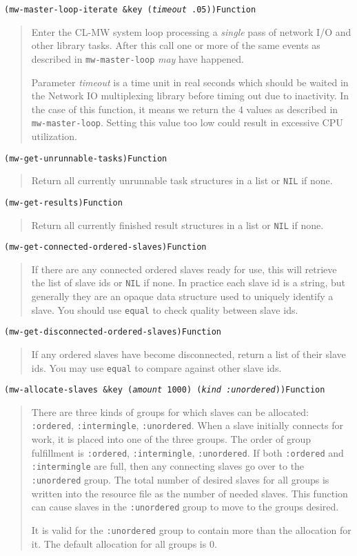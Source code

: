 \documentclass[titlepage,12pt]{book}
\newcommand{\xsmall}{\latexhtml{\small}{}}
\newcommand{\xnormalsize}{\latexhtml{\normalsize}{}}
\newcommand{\clmw}{\xsmall\textsc{CL-MW}\xnormalsize\xspace}
\newcommand{\un}{\texttt{:unordered}\xspace}
\newcommand{\inter}{\texttt{:intermingle}\xspace}
\newcommand{\ord}{\texttt{:ordered}\xspace}
\newcommand{\func}[1]{\mbox{\texttt{#1}}\xspace}
\newcommand{\bool}[1]{\texttt{#1}\xspace}
\newcommand{\apifunc}[2]{\noindent\xsmall\texttt{(#1)}\hspace*{\fill}\xnormalsize\texttt{#2}}
\newenvironment{apientry}[2]
	{\apifunc{#1}{#2}\begin{quotation}}
	{\end{quotation}}
\begin{document}
\begin{apientry}
{mw-master-loop-iterate \&key (\emph{timeout} .05)}
{Function}
Enter the \clmw system loop processing a \emph{single} pass of network
I/O and other library tasks. After this call one or more of the same events
as described in \func{mw-master-loop} \emph{may} have happened.

Parameter \emph{timeout} is a time unit in real seconds which should
be waited in the Network IO multiplexing library before timing out
due to inactivity.  In the case of this function, it means we return
the 4 values as described in \func{mw-master-loop}. Setting this value
too low could result in excessive CPU utilization.

\end{apientry}

\begin{apientry}
{mw-get-unrunnable-tasks}
{Function}
Return all currently unrunnable task structures in a list or \bool{NIL} if none.
\end{apientry}

\begin{apientry}
{mw-get-results}
{Function}
Return all currently finished result structures in a list or \bool{NIL} if none.
\end{apientry}

\begin{apientry}
{mw-get-connected-ordered-slaves}
{Function}
If there are any connected ordered slaves ready for use, this will
retrieve the list of slave ids or \bool{NIL} if none. In practice each slave
id is a string, but generally they are an opaque data structure used
to uniquely identify a slave. You should use \func{equal} to check
quality between slave ids.
\end{apientry}

\begin{apientry}
{mw-get-disconnected-ordered-slaves}
{Function}
If any ordered slaves have become disconnected, return a list of
their slave ids. You may use \func{equal} to compare against other
slave ids.
\end{apientry}

\begin{apientry}
{mw-allocate-slaves \&key (\emph{amount} 1000) (\emph{kind :unordered})}
{Function}
There are three kinds of groups for which slaves can be allocated:
\ord, \inter, \un.  When a slave initially connects for work, it is
placed into one of the three groups.  The order of group fulfillment
is \ord, \inter, \un. If both \ord and \inter are full, then any
connecting slaves go over to the \un group. The total number of desired
slaves for all groups is written into the resource file as the number of
needed slaves. This function can cause slaves in the \un group to move to
the groups desired.

It is valid for the \un group to contain more than the allocation for
it.  The default allocation for all groups is 0.
\end{apientry}
\end{document}
